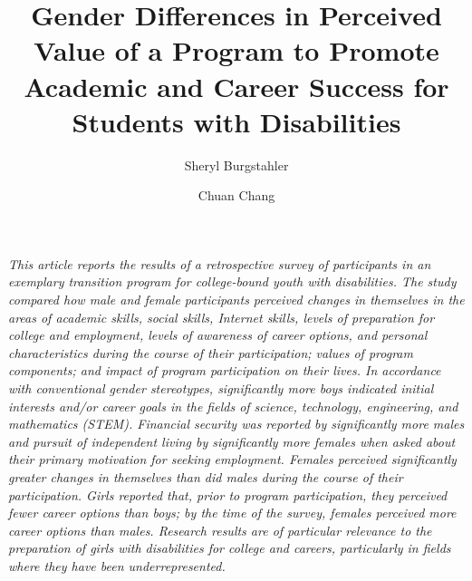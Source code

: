\documentclass[11.5pt]{sig-alternate} %
\makeatletter
\let\oldabstract\abstract
\let\oldendabstract\endabstract
\renewenvironment{abstract} %
{\renewenvironment{quotation}%
               {\list{}{\addtolength{\leftmargin}{1em} %
                        \listparindent 1.5em%
                        \itemindent    \listparindent%
                        \rightmargin   \leftmargin%
                        \parsep        \z@ \@plus\p@}%
                \item\relax}%
               {\endlist}%
\oldabstract}
{\oldendabstract}
\makeatother
\begin{document}
\title{Gender Differences in Perceived Value of a Program to Promote Academic and Career Success for Students with Disabilities}

\author[1]{\large \color{blue}Sheryl Burgstahler }
\author[2]{\large \color{blue}Chuan Chang }


\toappear{}
\maketitle
\begin{@twocolumnfalse} 
\begin{abstract}
\item 
\textit{This article reports the results of a retrospective survey of participants in an exemplary transition program for college-bound youth with disabilities. The study compared how male and female participants perceived changes in themselves in the areas of academic skills, social skills, Internet skills, levels of preparation for college and employment, levels of awareness of career options, and personal characteristics during the course of their participation; values of program components; and impact of program participation on their lives. In accordance with conventional gender stereotypes, significantly more boys indicated initial interests and/or career goals in the fields of science, technology, engineering, and mathematics (STEM). Financial security was reported by significantly more males and pursuit of independent living by significantly more females when asked about their primary motivation for seeking employment. Females perceived significantly greater changes in themselves than did males during the course of their participation. Girls reported that, prior to program participation, they perceived fewer career options than boys; by the time of the survey, females perceived more career options than males. Research results are of particular relevance to the preparation of girls with disabilities for college and careers, particularly in fields where they have been underrepresented.}
\\ \\
     
\end{abstract}
\end{@twocolumnfalse}

\end{document}
